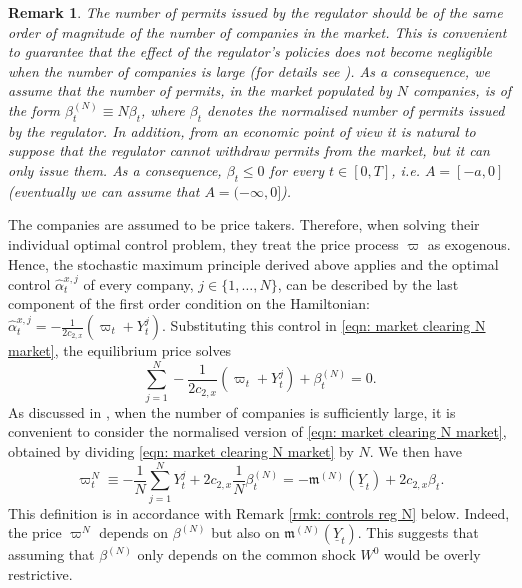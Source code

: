 \documentclass[10pt,a4paper]{amsart}
\newtheorem{remark}[theorem]{Remark}
\numberwithin{equation}{section}
\newcommand{\w}{\varpi}
\renewcommand{\hat}{\widehat}
\begin{document}
\begin{remark}
\label{rmk:beta-sign}
The number of permits issued by the regulator should be of the same order of magnitude of the number of companies in the market. This is convenient to guarantee that the effect of the regulator's policies does not become negligible when the number of companies is large (for details see \cite[Remark 3.11]{fujii2022equilibrium}). As a consequence, we assume that the number of permits, in the market populated by $N$ companies, is of the form $\beta^{(N)}_t \equiv N {\beta}_t$, where $\beta_t$ denotes the \emph{normalised number of permits} issued by the regulator. 
In addition, from an economic point of view it is natural to suppose that the regulator cannot withdraw permits from the market, but it can only issue them. As a consequence, $\beta_t\leq0$ for every $t\in[0,T]$, i.e. $A= [-a,0]$ (eventually we can assume that $A = (-\infty, 0]$). 
\end{remark}

The companies are assumed to be price takers. Therefore, when solving their individual optimal control problem, they treat the price process $\w$ as exogenous. Hence, the stochastic maximum principle derived above applies and the optimal control $\hat{\alpha}^{x,j}_t$ of every company, $j \in \{1, \dots, N\}$, can be described by the last component of the first order condition on the Hamiltonian: $\widehat{\alpha}^{x,j}_t= -\frac{1}{2c_{2,x}}(\w_t + Y^j_t)$. Substituting this control in \eqref{eqn: market clearing N market}, the equilibrium price solves
\begin{equation*} 
    \sum_{j = 1}^{N} -\frac{1}{2c_{2,x}}(\w_t + Y^j_t) + \beta^{(N)}_t = 0.
\end{equation*}
As discussed in \cite{follmer1974random}, when the number of companies is sufficiently large, it is convenient to consider the normalised version of \eqref{eqn: market clearing N market}, obtained by dividing \eqref{eqn: market clearing N market} by $N$. We then have 
\begin{equation} 
\label{eqn: eq price process N}
    \w^N_t 
    \equiv -\frac{1}{N}\sum_{j = 1}^{N}Y^j_t + 2c_{2,x}\frac{1}{N}\beta^{(N)}_t 
    = -\mathfrak{m}^{(N)}(\underline{Y}_t) + 2c_{2,x}\beta_t. 
\end{equation}
This definition is in accordance with Remark \ref{rmk: controls reg N} below. Indeed, the price $\w^N$ depends on $\beta^{(N)}$ but also on 
$\mathfrak{m}^{(N)}(\underline{Y}_t)$. 
This suggests that assuming that $\beta^{(N)}$ only depends on the common shock $W^0$ would be overly restrictive. 
\end{document}
